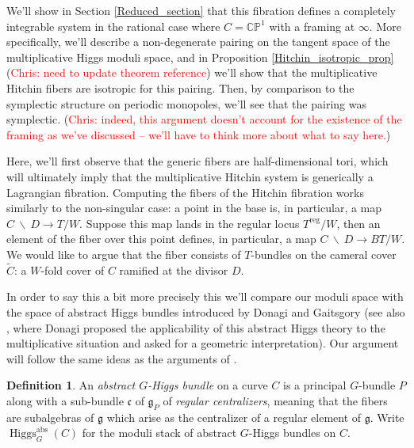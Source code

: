 \documentclass[11pt, oneside, reqno]{amsart}
\theoremstyle{definition} \newtheorem{definition}{Definition}[section]
\theoremstyle{definition} \newtheorem{remark}[definition]{Remark}
\theoremstyle{definition} \newtheorem{remarks}[definition]{Remarks}
\theoremstyle{definition} \newtheorem{question}[definition]{Question}
\theoremstyle{definition} \newtheorem*{note}{Note}
\theoremstyle{definition} \newtheorem{example}[definition]{Example}
\theoremstyle{definition} \newtheorem{examples}[definition]{Examples}
\renewcommand{\gg}{\mathfrak{g}}
\newcommand{\bb}[1]{\mathbb{#1}}
\newcommand{\mr}[1]{\mathrm{#1}}
\newcommand{\mf}[1]{\mathfrak{#1}}
\newcommand{\wt}[1]{\widetilde{#1}}
\newcommand{\bs}{\ \backslash \ }
\DeclareMathOperator{\higgs}{Higgs}
\newcommand{\chris}[1]{(\textcolor{red}{Chris: #1})}
\begin{document}
We'll show in Section \ref{Reduced_section} that this fibration defines a completely integrable system in the rational case where $C = \bb{CP}^1$ with a framing at $\infty$. More specifically, we'll describe a non-degenerate pairing on the tangent space of the multiplicative Higgs moduli space, and in Proposition \ref{Hitchin_isotropic_prop} \chris{need to update theorem reference} we'll show that the multiplicative Hitchin fibers are isotropic for this pairing.  Then, by comparison to the symplectic structure on periodic monopoles, we'll see that the pairing was symplectic. \chris{indeed, this argument doesn't account for the existence of the framing as we've discussed -- we'll have to think more about what to say here.}

Here, we'll first observe that the generic fibers are half-dimensional tori, which will ultimately imply that the multiplicative Hitchin system is generically a Lagrangian fibration.  Computing the fibers of the Hitchin fibration works similarly to the non-singular case: a point in the base is, in particular, a map $C \bs D \to T/W$.  Suppose this map lands in the regular locus $T^{\mr{reg}}/W$, then an element of the fiber over this point defines, in particular, a map $C \bs D \to BT/W$.  We would like to argue that the fiber consists of $T$-bundles on the cameral cover $\wt C$: a $W$-fold cover of $C$ ramified at the divisor $D$.

In order to say this a bit more precisely this we'll compare our moduli space with the space of abstract Higgs bundles introduced by Donagi and Gaitsgory \cite{DonagiGaitsgory} (see also \cite{DonagiLectures}, where Donagi proposed the applicability of this abstract Higgs theory to the multiplicative situation and asked for a geometric interpretation).  Our argument will follow the same ideas as the arguments of \cite[Section 6]{HurtubiseMarkman}.

\begin{definition}
An \emph{abstract $G$-Higgs bundle} on a curve $C$ is a principal $G$-bundle $P$ along with a sub-bundle $\mf c$ of $\gg_P$ of \emph{regular centralizers}, meaning that the fibers are subalgebras of $\gg$ which arise as the centralizer of a regular element of $\gg$.  Write $\higgs_G^{\mr{abs}}(C)$ for the moduli stack of abstract $G$-Higgs bundles on $C$.
\end{definition}
\end{document}
